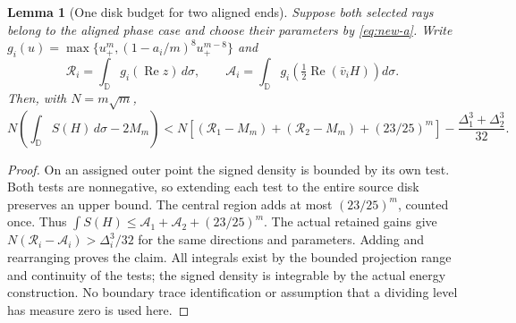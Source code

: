\documentclass[11pt]{article}
\newtheorem{lemma}[theorem]{Lemma}
\newcommand{\D}{\mathbb D}
\begin{document}
	\begin{lemma}[One disk budget for two aligned ends]\label{lem:aligned-disk-budget}
		Suppose both selected rays belong to the aligned phase case and
		choose their parameters by \eqref{eq:new-a}.  Write
		$g_i(u)=\max\{u_+^m,(1-a_i/m)^8u_+^{m-8}\}$ and
		\[
		\mathcal R_i=\int_{\D}g_i(\operatorname{Re}z)\,d\sigma,
		\qquad
		\mathcal A_i=\int_{\D}g_i\!\left(\tfrac12
		\operatorname{Re}(\bar v_iH)\right)d\sigma.
		\]
		Then, with $N=m\sqrt m$,
		\[
		N\left(\int_{\D}S(H)\,d\sigma-2M_m\right)
		<N\left[(\mathcal R_1-M_m)+(\mathcal R_2-M_m)+(23/25)^m\right]
		-\frac{\Delta_1^3+\Delta_2^3}{32}.
		\]
	\end{lemma}
	\begin{proof}
		On an assigned outer point the signed density is bounded by its
		own test.  Both tests are nonnegative, so extending each test to
		the entire source disk preserves an upper bound.  The central
		region adds at most $(23/25)^m$, counted once.  Thus
		$\int S(H)\leq\mathcal A_1+\mathcal A_2+(23/25)^m$.
		The actual retained gains give
		$N(\mathcal R_i-\mathcal A_i)>\Delta_i^3/32$ for the same
		directions and parameters.  Adding and rearranging proves the
		claim.  All integrals exist by the bounded projection range and
		continuity of the tests; the signed density is integrable by the
		actual energy construction.  No boundary trace identification or
		assumption that a dividing level has measure zero is used here.
	\end{proof}
	
\end{document}
